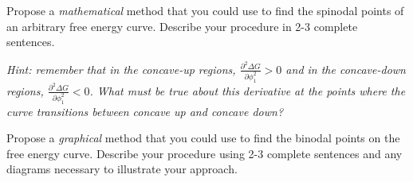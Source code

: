 \begin{activity}
\begin{ctqs}
	\question Propose a \emph{mathematical} method that you could use to find the spinodal points of an arbitrary free energy curve.  Describe your procedure in 2-3 complete sentences.
	
		\emph{Hint: remember that in the concave-up regions, $\frac{\partial^2\Delta G}{\partial \phi_1^2} > 0$ and in the concave-down regions, $\frac{\partial^2\Delta G}{\partial \phi_1^2} < 0$.  What must be true about this derivative at the points where the curve transitions between concave up and concave down?}
		
	\question Propose a \emph{graphical} method that you could use to find the binodal points on the free energy curve.  Describe your procedure using 2-3 complete sentences and any diagrams necessary to illustrate your approach.
\end{ctqs}




	
\end{activity}